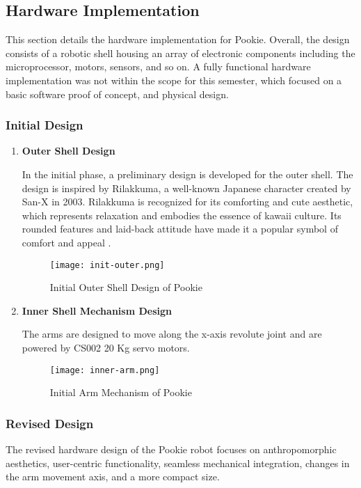 \subsection{Hardware Implementation}
This section details the hardware implementation for Pookie. Overall, the design consists of a robotic shell housing an array of electronic components including the microprocessor, motors, sensors, and so on. A fully functional hardware implementation was not within the scope for this semester, which focused on a basic software proof of concept, and physical design.


\subsubsection{Initial Design}
\begin{enumerate}

    \item\textbf{Outer Shell Design}
    
    In the initial phase, a preliminary design is developed for the outer shell. The design is inspired by Rilakkuma, a well-known Japanese character created by San-X in 2003. Rilakkuma is recognized for its comforting and cute aesthetic, which represents relaxation and embodies the essence of kawaii culture. Its rounded features and laid-back attitude have made it a popular symbol of comfort and appeal \cite{hinka_rilakkuma_history}.
    
    \begin{figure}[ht]
        \centering
        \texttt{[image: init-outer.png]}
        \caption{Initial Outer Shell Design of Pookie}
        \label{fig:init-outer}
    \end{figure}

    \item\textbf{Inner Shell Mechanism Design}

    The arms are designed to move along the x-axis revolute joint and are powered by CS002 20 Kg servo motors.
    \begin{figure}[ht]
        \centering
        \texttt{[image: inner-arm.png]}
        \caption{Initial Arm Mechanism of Pookie}
        \label{fig:inner-arm}
    \end{figure}
    
\end{enumerate}
\subsubsection{Revised Design}
The revised hardware design of the Pookie robot focuses on anthropomorphic aesthetics, user-centric functionality, seamless mechanical integration, changes in the arm movement axis, and a more compact size.

